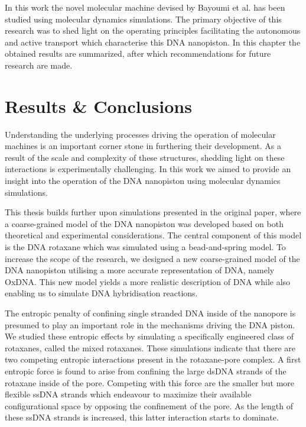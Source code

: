 \noindent In this work the novel molecular machine devised by Bayoumi et al. has been
studied using
molecular dynamics simulations. The primary objective of this research was to shed
light on the operating principles facilitating the autonomous and active transport which
characterise this DNA nanopiston. In this chapter the obtained results are summarized,
after which recommendations for future research are made.

\section{Results \& Conclusions}

Understanding the underlying processes driving the operation of molecular machines is an
important corner stone in furthering their development. As a result of the scale and
complexity of these structures, shedding light on these interactions is experimentally
challenging. In this work we aimed to provide an insight into the operation of the
DNA nanopiston using molecular dynamics simulations.

This thesis builds further upon simulations presented in the original paper, where a
coarse-grained model of the DNA nanopiston was developed based on both theoretical and
experimental considerations. The central component of this model is the DNA rotaxane
which was simulated using a bead-and-spring model. To increase the scope of the research,
we designed a new coarse-grained model of the DNA nanopiston utilising a more accurate
representation of DNA, namely OxDNA. This new model yields a more realistic description
of DNA while also enabling us to simulate DNA hybridisation reactions.

The entropic penalty of confining single stranded DNA inside of the nanopore is presumed
to play an important role in the mechanisms driving the DNA piston. We studied these
entropic effects by simulating a specifically engineered class of rotaxanes, called the
mixed rotaxanes. These simulations indicate that there are two competing entropic
interactions present in the rotaxane-pore complex. A first entropic force is found to
arise from confining the large dsDNA strands of the rotaxane inside of the pore.
Competing with this force are the smaller but more flexible ssDNA strands which endeavour
to maximize their available configurational space by opposing the confinement of the
pore. As the length of these ssDNA strands is increased, this latter interaction starts
to dominate.

